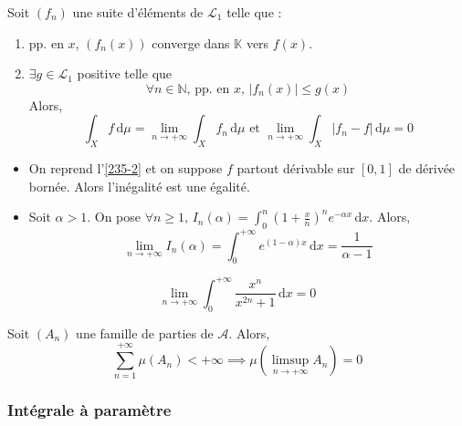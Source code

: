   \begin{theorem}
    Soit $(f_n)$ une suite d'éléments de $\mathcal{L}_1$ telle que :
    \begin{enumerate}[label=(\roman*)]
      \item pp. en $x$, $(f_n(x))$ converge dans $\mathbb{K}$ vers $f(x)$.
      \item $\exists g \in \mathcal{L}_1$ positive telle que
      \[ \forall n \in \mathbb{N}, \, \text{pp. en } x, \, \vert f_n(x) \vert \leq g(x) \]
      Alors,
      \[ \int_X f \, \mathrm{d}\mu = \lim_{n \rightarrow +\infty} \int_X f_n \, \mathrm{d}\mu \text{ et } \lim_{n \rightarrow +\infty} \int_X \vert f_n - f \vert \, \mathrm{d}\mu = 0 \]
    \end{enumerate}
  \end{theorem}

  \begin{example}
    \begin{itemize}
      \item On reprend l'\cref{235-2} et on suppose $f$ partout dérivable sur $[0,1]$ de dérivée bornée. Alors l'inégalité est une égalité.
      \item Soit $\alpha > 1$. On pose $\forall n \geq 1, \, I_n(\alpha) = \int_0^n \left( 1 + \frac{x}{n} \right)^n e^{-\alpha x} \, \mathrm{d}x$. Alors,
      \[ \lim_{n \rightarrow +\infty} I_n(\alpha) = \int_0^{+\infty} e^{(1-\alpha)x} \, \mathrm{d}x = \frac{1}{\alpha - 1} \]
    \end{itemize}
  \end{example}


  \begin{example}
    \[ \lim_{n \rightarrow +\infty} \int_{0}^{+\infty} \frac{x^n}{x^{2n} + 1} \, \mathrm{d}x = 0 \]
  \end{example}


  \begin{application}
    Soit $(A_n)$ une famille de parties de $\mathcal{A}$. Alors,
    \[ \sum_{n=1}^{+\infty} \mu(A_n) < +\infty \implies \mu \left( \limsup_{n \rightarrow +\infty} A_n \right) = 0 \]
  \end{application}

  \subsubsection{Intégrale à paramètre}

